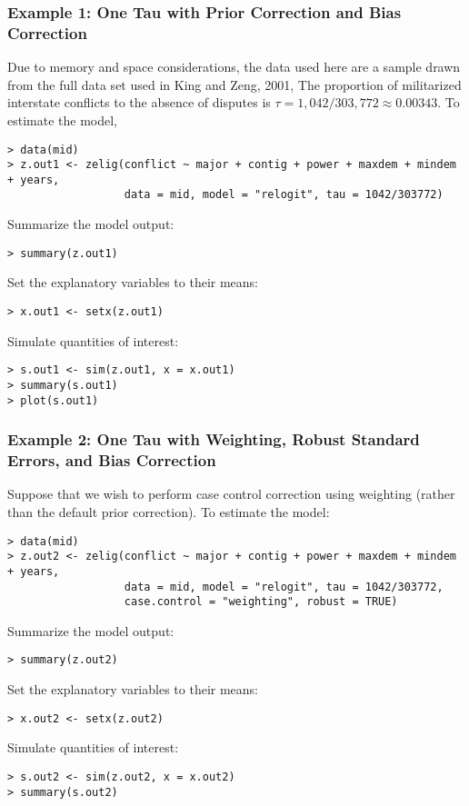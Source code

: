 \subsubsection*{Example 1: One Tau with Prior Correction and Bias Correction}

Due to memory and space considerations, the data used here are a
sample drawn from the full data set used in King and Zeng,
2001,\nocite{KinZen01b}  The proportion of militarized interstate
conflicts to the absence of disputes is $\tau = 1,042 / 303,772
\approx 0.00343$.  To estimate the model,
\begin{verbatim}
> data(mid)
> z.out1 <- zelig(conflict ~ major + contig + power + maxdem + mindem + years,
                  data = mid, model = "relogit", tau = 1042/303772)
\end{verbatim}
Summarize the model output:  
\begin{verbatim}
> summary(z.out1)
\end{verbatim}
Set the explanatory variables to their means:  
\begin{verbatim}
> x.out1 <- setx(z.out1)
\end{verbatim}
Simulate quantities of interest:
\begin{verbatim}
> s.out1 <- sim(z.out1, x = x.out1)
> summary(s.out1)
> plot(s.out1)
\end{verbatim}

\subsubsection*{Example 2: One Tau with Weighting, Robust Standard
Errors, and Bias Correction} 

Suppose that we wish to perform case control correction using
weighting (rather than the default prior correction).  To
estimate the model:  
\begin{verbatim}
> data(mid)
> z.out2 <- zelig(conflict ~ major + contig + power + maxdem + mindem + years,
                  data = mid, model = "relogit", tau = 1042/303772, 
                  case.control = "weighting", robust = TRUE)
\end{verbatim}
Summarize the model output:  
\begin{verbatim}
> summary(z.out2)
\end{verbatim}
Set the explanatory variables to their means:  
\begin{verbatim}
> x.out2 <- setx(z.out2)
\end{verbatim}
Simulate quantities of interest:
\begin{verbatim}
> s.out2 <- sim(z.out2, x = x.out2)
> summary(s.out2)
\end{verbatim}

